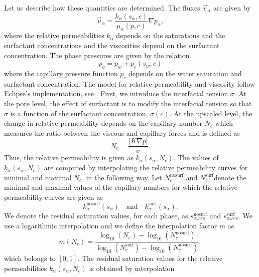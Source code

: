 \documentclass[11pt]{amsart}
\newcommand{\grad}{\nabla}
\newcommand{\abs}[1]{\left| #1\right|}
\newcommand{\surf}{\text{surf}}
\newcommand{\nosurf}{\text{nosurf}}
\begin{document}
Let us describe how these quantities are determined. The fluxes $\vec{v}_\alpha$ are given by
\begin{equation*}
  \vec{v}_\alpha = \frac{k_{\alpha}(s_\alpha, c)}{\mu_{\alpha}(p, c)}\grad p_\alpha,
\end{equation*}
where the relative permeabilities $k_{\alpha}$ depends on the saturations and the surfactant
concentrations and the viscosities depend on the surfactant concentration. The phase pressures are
given by the relation
\begin{equation}
  p_o = p_w + p_c(s_w, c) 
\end{equation}
where the capillary pressure function $p_c$ depends on the water saturation and
surfactant concentration. The model for relative permeability and viscosity
follow Eclipse's implementation, see \cite{eclipse, jorgensen}. First, we
introduce the interfacial tension $\sigma$. At the pore level, the effect of
surfactant is to modify the interfacial tension so that $\sigma$ is a function
of the surfactant concentration, $\sigma(c)$. At the upscaled level, the change in
relative permeability depends on the capillary number $N_c$ which measures
the ratio between the viscous and capillary forces and is defined as
\begin{equation}
  \label{eq:defNc}
  N_c = \frac{\abs{K\grad p}}{\sigma}.
\end{equation}
Thus, the relative permeability is given as $k_{\alpha}(s_\alpha, N_c)$. The values of
$k_{\alpha}(s_\alpha, N_c)$ are computed by interpolating the relative permeability curves for
minimal and maximal $N_c$, in the following way. Let $N_c^{\nosurf}$ and $N_c^{\surf}$denote the
minimal and maximal values of the capillary numbers for which the relative permeability curves are
given as
\begin{equation*}
  k_{\alpha}^{\nosurf}(s_\alpha)\quad\text{and}\quad k_{\alpha}^{\surf}(s_\alpha).
\end{equation*}
We denote the residual saturation values, for each phase, as $s_{\alpha. res}^{\nosurf}$ and
$s_{\alpha. res}^{\surf}$. We use a logarithmic interpolation and we define the interpolation factor
$m$ as
\begin{equation} 
  \label{eq:defm}
  m(N_c) = \frac{\log_{10}(N_c) - \log_{10}(N_c^{\nosurf})}{\log_{10}(N_c^{\surf}) - \log_{10}(N_c^{\nosurf})},
\end{equation}
which belongs to $[0,1]$. The residual saturation values for the relative permeabilities
$k_{\alpha}(s_\alpha, N_c)$ is obtained by interpolation
\end{document}
